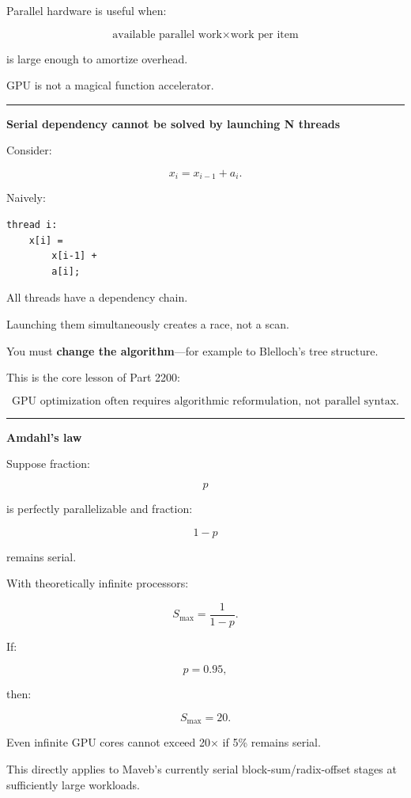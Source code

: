 Parallel hardware is useful when:

\[
\boxed{
\text{available parallel work}
\times
\text{work per item}
}
\]

is large enough to amortize overhead.

GPU is not a magical function accelerator.

\begin{center}\rule{0.5\linewidth}{0.5pt}\end{center}

\textbf{Serial dependency cannot be solved by launching N threads}

Consider:

\[
x_i=
x_{i-1}+a_i.
\]

Naively:

\protect{}\label{p10-bad-prefix}%
\begin{verbatim}
thread i:
    x[i] =
        x[i-1] +
        a[i];
\end{verbatim}

All threads have a dependency chain.

Launching them simultaneously creates a race, not a scan.

You must \textbf{change the algorithm}---for example to Blelloch's tree structure.

This is the core lesson of Part 2200:

\[
\boxed{
\text{GPU optimization often requires algorithmic reformulation, not parallel syntax}.
}
\]

\begin{center}\rule{0.5\linewidth}{0.5pt}\end{center}

\textbf{Amdahl's law}

Suppose fraction:

\[
p
\]

is perfectly parallelizable and fraction:

\[
1-p
\]

remains serial.

With theoretically infinite processors:

\[
\boxed{
S_{\max}
=
\frac1{1-p}.
}
\]

If:

\[
p=0.95,
\]

then:

\[
S_{\max}=20.
\]

Even infinite GPU cores cannot exceed 20× if 5\% remains serial.

This directly applies to Maveb's currently serial block-sum/radix-offset stages at sufficiently large workloads.


